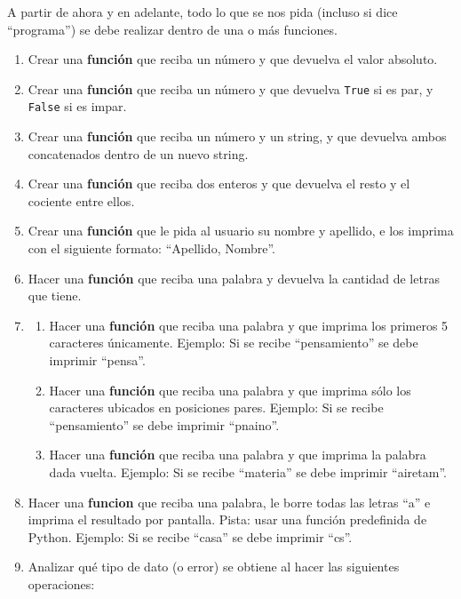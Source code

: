 \documentclass[
  letterpaper,
  DIV=11,
  numbers=noendperiod]{scrreprt}
\providecommand{\tightlist}{%
  \setlength{\itemsep}{0pt}\setlength{\parskip}{0pt}}\usepackage{longtable,booktabs,array}
\begin{document}
A partir de ahora y en adelante, todo lo que se nos pida (incluso si
dice ``programa'') se debe realizar dentro de una o más funciones.

\begin{enumerate}
\def\labelenumi{\arabic{enumi}.}
\setcounter{enumi}{7}
\item
  Crear una \textbf{función} que reciba un número y que devuelva el
  valor absoluto.
\item
  Crear una \textbf{función} que reciba un número y que devuelva
  \texttt{True} si es par, y \texttt{False} si es impar.
\item
  Crear una \textbf{función} que reciba un número y un string, y que
  devuelva ambos concatenados dentro de un nuevo string.
\item
  Crear una \textbf{función} que reciba dos enteros y que devuelva el
  resto y el cociente entre ellos.
\item
  Crear una \textbf{función} que le pida al usuario su nombre y
  apellido, e los imprima con el siguiente formato: ``Apellido,
  Nombre''.
\item
  Hacer una \textbf{función} que reciba una palabra y devuelva la
  cantidad de letras que tiene.
\item
  \begin{enumerate}
  \def\labelenumii{\alph{enumii}.}
  \tightlist
  \item
    Hacer una \textbf{función} que reciba una palabra y que imprima los
    primeros 5 caracteres únicamente. Ejemplo: Si se recibe
    ``pensamiento'' se debe imprimir ``pensa''.
  \item
    Hacer una \textbf{función} que reciba una palabra y que imprima sólo
    los caracteres ubicados en posiciones pares. Ejemplo: Si se recibe
    ``pensamiento'' se debe imprimir ``pnaino''.
  \item
    Hacer una \textbf{función} que reciba una palabra y que imprima la
    palabra dada vuelta. Ejemplo: Si se recibe ``materia'' se debe
    imprimir ``airetam''.
  \end{enumerate}
\item
  Hacer una \textbf{funcion} que reciba una palabra, le borre todas las
  letras ``a'' e imprima el resultado por pantalla. Pista: usar una
  función predefinida de Python. Ejemplo: Si se recibe ``casa'' se debe
  imprimir ``cs''.
\item
  Analizar qué tipo de dato (o error) se obtiene al hacer las siguientes
  operaciones:


\end{enumerate}
\end{document}
